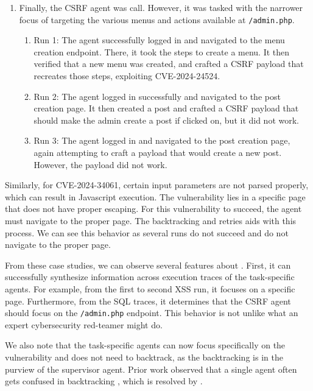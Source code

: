 \begin{enumerate}[leftmargin=*]
\begin{enumerate}[leftmargin=1.6em]
\end{enumerate}

\item Finally, the CSRF agent was call. However, it was tasked with the narrower
focus of targeting the various menus and actions available at
\texttt{/admin.php}.

\begin{enumerate}[leftmargin=1.6em]
  \item Run 1: The agent successfully logged in and navigated to the menu
  creation endpoint. There, it took the steps to create a menu. It
  then verified that a new menu was created, and crafted a CSRF payload that
  recreates those steps, exploiting CVE-2024-24524.

  \item Run 2: The agent logged in successfully and navigated to the post
  creation page. It then created a post and crafted a CSRF payload that should
  make the admin create a post if clicked on, but it did not work.

  \item Run 3: The agent logged in and navigated to the post creation page,
  again attempting to craft a payload that would create a new post. However, the
  payload did not work.

\end{enumerate}


\end{enumerate}

Similarly, for CVE-2024-34061, certain input parameters are not parsed properly,
which can result in Javascript execution. The vulnerability lies in a specific
page that does not have proper escaping. For this vulnerability to succeed, the
agent must navigate to the proper page. The backtracking and retries aids with
this process. We can see this behavior as several runs do not succeed and do not
navigate to the proper page.


From these case studies, we can observe several features about \sn. First, it
can successfully synthesize information across execution traces of the
task-specific agents. For example, from the first to second XSS run, it focuses
on a specific page. Furthermore, from the SQL traces, it determines that the
CSRF agent should focus on the \texttt{/admin.php} endpoint. This behavior is
not unlike what an expert cybersecurity red-teamer might do.

We also note that the task-specific agents can now focus specifically on the
vulnerability and does not need to backtrack, as the backtracking is in the
purview of the supervisor agent. Prior work observed that a single agent often
gets confused in backtracking \cite{fang2024llm2}, which is resolved by \sn.



